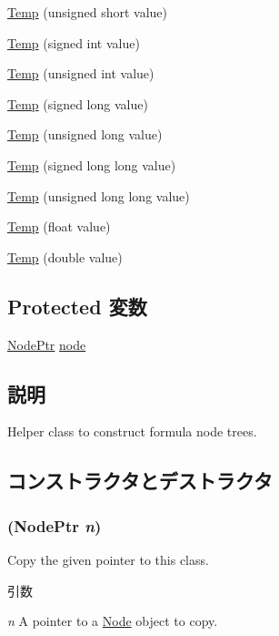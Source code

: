 \begin{DoxyCompactItemize}
\item 
\hyperlink{classStats_1_1Temp_a9962ba91d7f788905fdd0517164addc2}{Temp} (unsigned short value)
\item 
\hyperlink{classStats_1_1Temp_a6416d23d572b589f2bc19cccec23acb3}{Temp} (signed int value)
\item 
\hyperlink{classStats_1_1Temp_a3f96b380a4b54f2a5419b26b731d4ab3}{Temp} (unsigned int value)
\item 
\hyperlink{classStats_1_1Temp_af5aa35210a4bb8a13b757ed7457fa332}{Temp} (signed long value)
\item 
\hyperlink{classStats_1_1Temp_a47e3f83051230ab10dc3a88c9bf47650}{Temp} (unsigned long value)
\item 
\hyperlink{classStats_1_1Temp_a7a9300e968eebea58abc15bdb8917944}{Temp} (signed long long value)
\item 
\hyperlink{classStats_1_1Temp_a3ee978f64b4ef52a6705f98ee4de44bf}{Temp} (unsigned long long value)
\item 
\hyperlink{classStats_1_1Temp_a65c95538239eeb39b8b7396cff0d6224}{Temp} (float value)
\item 
\hyperlink{classStats_1_1Temp_a7a15a2cd2ec08bb72204b15f13c41c58}{Temp} (double value)
\end{DoxyCompactItemize}
\subsection*{Protected 変数}
\begin{DoxyCompactItemize}
\item 
\hyperlink{classRefCountingPtr}{NodePtr} \hyperlink{classStats_1_1Temp_af543614539e0077318342ca740f88513}{node}
\end{DoxyCompactItemize}


\subsection{説明}
Helper class to construct formula node trees. 

\subsection{コンストラクタとデストラクタ}
\hypertarget{classStats_1_1Temp_ae50065936f32602ef6add450b66e4118}{
\subsubsection[{Temp}]{ ({\bf NodePtr} {\em n})}}
\label{classStats_1_1Temp_ae50065936f32602ef6add450b66e4118}
Copy the given pointer to this class. 
\begin{DoxyParams}{引数}
\item[{\em n}]A pointer to a \hyperlink{classStats_1_1Node}{Node} object to copy. \end{DoxyParams}



